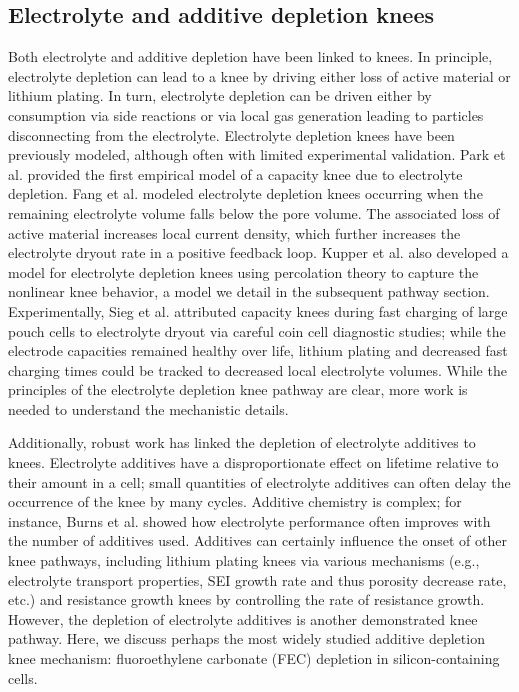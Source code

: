 \documentclass[journal=jpclcd,manuscript=article]{achemso}
\begin{document}
\subsection{Electrolyte and additive depletion knees}

Both electrolyte and additive depletion have been linked to knees.
In principle, electrolyte depletion can lead to a knee by driving either loss of active material\cite{mao_calendar_2017, kupper_end--life_2018, fang_capacity_2021} or lithium plating\cite{sieg_fast-charging_2022}{}.
In turn, electrolyte depletion can be driven either by consumption via side reactions\cite{stevens_using_2014, park_semi-empirical_2017,sieg_fast-charging_2022} or via local gas generation leading to particles disconnecting from the electrolyte\cite{mao_calendar_2017, kupper_end--life_2018}{}.
Electrolyte depletion knees have been previously modeled, although often with limited experimental validation.
Park et al.\cite{park_semi-empirical_2017} provided the first empirical model of a capacity knee due to electrolyte depletion.
Fang et al.\cite{fang_capacity_2021} modeled electrolyte depletion knees occurring when the remaining electrolyte volume falls below the pore volume. The associated loss of active material increases local current density, which further increases the electrolyte dryout rate in a positive feedback loop.
Kupper et al.\cite{kupper_end--life_2018} also developed a model for electrolyte depletion knees using percolation theory to capture the nonlinear knee behavior, a model we detail in the subsequent pathway section. 
Experimentally, Sieg et al.\cite{sieg_fast-charging_2022} attributed capacity knees during fast charging of large pouch cells to electrolyte dryout via careful coin cell diagnostic studies; while the electrode capacities remained healthy over life, lithium plating and decreased fast charging times could be tracked to decreased local electrolyte volumes.
While the principles of the electrolyte depletion knee pathway are clear, more work is needed to understand the mechanistic details. 

Additionally, robust work has linked the depletion of electrolyte additives to knees. Electrolyte additives have a disproportionate effect on lifetime relative to their amount in a cell; small quantities of electrolyte additives can often delay the occurrence of the knee by many cycles.\cite{ma_editors_2019, li_comparison_2017} Additive chemistry is complex; for instance, Burns et al.\cite{burns_predicting_2013} showed how electrolyte performance often improves with the number of additives used. Additives can certainly influence the onset of other knee pathways, including lithium plating knees via various mechanisms (e.g., electrolyte transport properties, SEI growth rate and thus porosity decrease rate, etc.) and resistance growth knees by controlling the rate of resistance growth\cite{ma_editors_2019}. However, the depletion of electrolyte additives is another demonstrated knee pathway. Here, we discuss perhaps the most widely studied additive depletion knee mechanism: fluoroethylene carbonate (FEC) depletion in silicon-containing cells.
\end{document}
